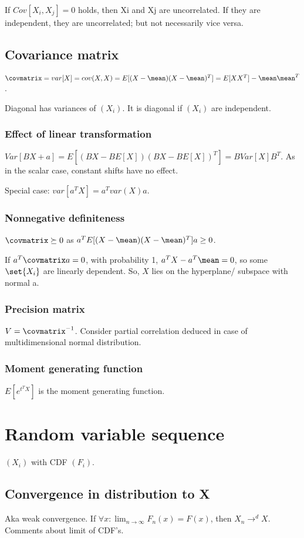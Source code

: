 \documentclass[oneside, article]{memoir}
\begin{document}
If $Cov[X_{i},X_{j}] = 0$ holds, then Xi and Xj are uncorrelated. If they are independent, they are uncorrelated; but not necessarily vice versa.

\section{Covariance matrix}
$\covmatrix = var[X] = cov(X, X) = E[(X-\mean)(X-\mean)^{T}] = E[XX^{T}] - \mean \mean^{T}$.

Diagonal has variances of $(X_{i})$. It is diagonal if $(X_{i})$ are independent.

\subsection{Effect of linear transformation}
$Var[BX + a] = E[(BX - BE[X])(BX - BE[X])^{T}] = BVar[X]B^{T}$. As in the scalar case, constant shifts have no effect.

Special case: $var[a^{T}X] = a^{T}var(X)a$.

\subsection{Nonnegative definiteness}
$\covmatrix \succeq 0$ as $a^{T}E[(X-\mean)(X-\mean)^{T}]a \geq 0$.

If $a^{T}\covmatrix a = 0$, with probability 1, $a^{T}X - a^{T}\mean = 0$, so some $\set{X_i}$ are linearly dependent. So, $X$ lies on the hyperplane/ subspace with normal a.

\subsection{Precision matrix}
$V = \covmatrix^{-1}$. Consider partial correlation deduced in case of multidimensional normal distribution.

\subsection{Moment generating function}
$E[e^{t^{T}X}]$ is the moment generating function.

\chapter{Random variable sequence}
$(X_{i})$ with CDF $(F_i)$.

\section{Convergence in distribution to X}
Aka weak convergence. If $\forall x: \lim_{n \to \infty} F_n(x) = F(x)$, then $X_n \to^{d} X$. Comments about limit of CDF's.
\end{document}
